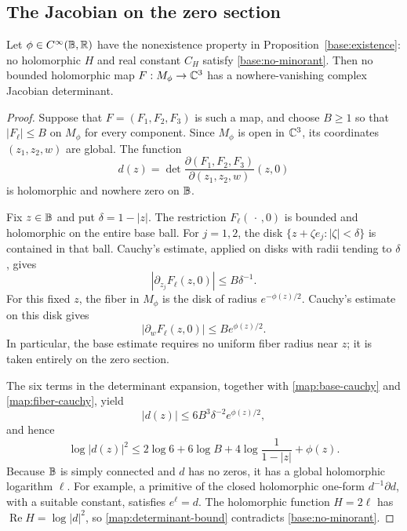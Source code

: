\subsection{The Jacobian on the zero section}

\begin{lemma}\label{map:obstruction}
Let $\phi\in C^\infty(\mathbb B,\mathbb R)$ have the nonexistence property in
Proposition~\ref{base:existence}: no holomorphic $H$ and real constant
$C_H$ satisfy \eqref{base:no-minorant}.  Then no bounded holomorphic
map $F:M_\phi\to\mathbb C^3$ has a nowhere-vanishing complex Jacobian
determinant.
\end{lemma}

\begin{proof}
Suppose that $F=(F_1,F_2,F_3)$ is such a map, and choose $B\ge1$ so
that $|F_\ell|\le B$ on $M_\phi$ for every component.  Since
$M_\phi$ is open in $\mathbb C^3$, its coordinates $(z_1,z_2,w)$ are global.
The function
\[
 d(z)=\det\frac{\partial(F_1,F_2,F_3)}{\partial(z_1,z_2,w)}(z,0)
\]
is holomorphic and nowhere zero on $\mathbb B$.

Fix $z\in\mathbb B$ and put $\delta=1-|z|$.  The restriction
$F_\ell(\,\cdot\,,0)$ is bounded and holomorphic on the entire base
ball.  For $j=1,2$, the disk
$\{z+\zeta e_j:|\zeta|<\delta\}$ is contained in that ball.  Cauchy's
estimate, applied on disks with radii tending to $\delta$, gives
\begin{equation}\label{map:base-cauchy}
 |\partial_{z_j}F_\ell(z,0)|\le B\delta^{-1}.
\end{equation}
For this fixed $z$, the fiber in $M_\phi$ is the disk of radius
$e^{-\phi(z)/2}$.  Cauchy's estimate on this disk gives
\begin{equation}\label{map:fiber-cauchy}
 |\partial_wF_\ell(z,0)|\le B e^{\phi(z)/2}.
\end{equation}
In particular, the base estimate requires no uniform fiber radius near
$z$; it is taken entirely on the zero section.

The six terms in the determinant expansion, together with
\eqref{map:base-cauchy} and \eqref{map:fiber-cauchy}, yield
\[
 |d(z)|\le6B^3\delta^{-2}e^{\phi(z)/2},
\]
and hence
\begin{equation}\label{map:determinant-bound}
 \log|d(z)|^2
 \le 2\log6+6\log B+4\log\frac1{1-|z|}+\phi(z).
\end{equation}
Because $\mathbb B$ is simply connected and $d$ has no zeros, it has a global
holomorphic logarithm $\ell$.  For example, a primitive of the closed
holomorphic one-form $d^{-1}\partial d$, with a suitable constant,
satisfies $e^\ell=d$.  The holomorphic function $H=2\ell$ has
$\operatorname{Re}H=\log|d|^2$, so \eqref{map:determinant-bound}
contradicts \eqref{base:no-minorant}.
\end{proof}

